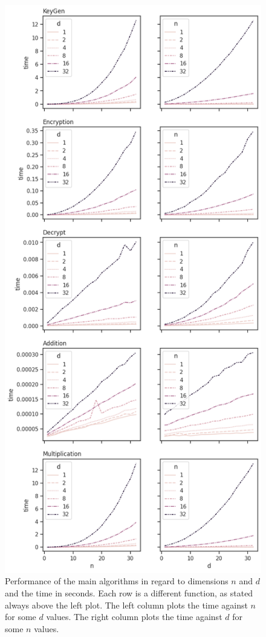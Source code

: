 \begin{figure}[htp]
  \centering
  \includegraphics[scale=0.5]{images/nd-performance.png}
  \caption[Performance of the HE algorithms by $n$ and $d$]{Performance of the main algorithms in regard to dimensions $n$ and $d$ and the time in seconds. Each row is a different function, as stated always above the left plot. The left column plots the time against $n$ for some $d$ values. The right column plots the time against $d$ for some $n$ values.}
  \label{fig:nd-performance}
\end{figure}

